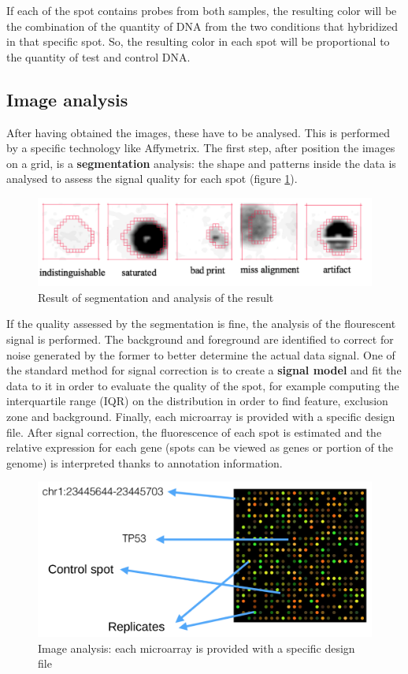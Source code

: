 	If each of the spot contains probes from both samples, the resulting color will be the combination of the quantity of DNA from the two conditions that hybridized in that specific spot.
	So, the resulting color in each spot will be proportional to the quantity of test and control DNA.

	\subsection{Image analysis}
	After having obtained the images, these have to be analysed.
	This is performed by a specific technology like Affymetrix.
	The first step, after position the images on a grid, is a \textbf{segmentation} analysis: the shape and patterns inside the data is analysed to assess the signal quality for each spot (figure \ref{fig:seg}).
	
	\begin{figure}
	\centering
	\includegraphics[scale=0.3]{segmentation}
	\caption{Result of segmentation and analysis of the result}
	\label{fig:seg}
\end{figure}		
	
	
	If the quality assessed by the segmentation is fine, the analysis of the flourescent signal is performed.
	The background and foreground are identified to correct for noise generated by the former to better determine the actual data signal.
	One of the standard method for signal correction is to create a \textbf{signal model} and fit the data to it in order to evaluate the quality of the spot, for example computing the interquartile range (IQR) on the distribution in order to find feature, exclusion zone and background.
	Finally, each microarray is provided with a specific design file.
	After signal correction, the fluorescence of each spot is estimated and the relative expression for each gene (spots can be viewed as genes or portion of the genome) is interpreted thanks to annotation information.

	\begin{figure}
	\centering
	\includegraphics[scale=0.2]{design}
	\caption{Image analysis: each microarray is provided with a specific
design file}
	\label{fig:design}
\end{figure}

